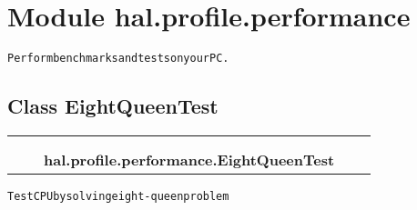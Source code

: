 %
%
%


\section{Module hal.profile.performance}

    \label{hal:profile:performance}
\begin{alltt}
Perform benchmarks and tests on your PC. 
\end{alltt}



\subsection{Class EightQueenTest}

    \label{hal:profile:performance:EightQueenTest}
\begin{tabular}{cccccc}
\multicolumn{2}{r}{\settowidth{\BCL}{object}\multirow{2}{\BCL}{object}}
&&
  \\\cline{3-3}
  &&\multicolumn{1}{c|}{}
&&
  \\
&&\multicolumn{2}{l}{\textbf{hal.profile.performance.EightQueenTest}}
\end{tabular}

\begin{alltt}
Test CPU by solving eight-queen problem 
\end{alltt}



